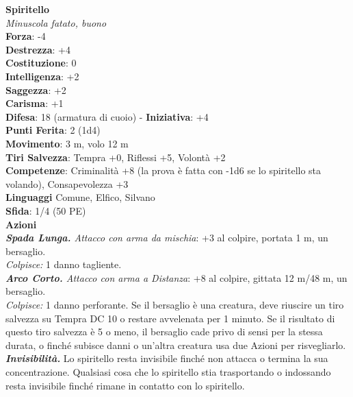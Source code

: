 \begin{multicols}{2}
\medskip\textbf{Spiritello}\\
\emph{Minuscola fatato, buono}\\
\textbf{Forza}: -4\\
\textbf{Destrezza}: +4\\
\textbf{Costituzione}: 0\\
\textbf{Intelligenza}: +2\\
\textbf{Saggezza}: +2\\
\textbf{Carisma}: +1\\
\textbf{Difesa}: 18 (armatura di cuoio) - \textbf{Iniziativa}: +4\\
\textbf{Punti Ferita}: 2 (1d4)\\
\textbf{Movimento}: 3 m, volo 12 m\\
\textbf{Tiri Salvezza}: Tempra +0, Riflessi +5, Volontà +2\\
\textbf{Competenze}: Criminalità +8 (la prova è fatta con -1d6 se lo spiritello sta volando), Consapevolezza +3\\
\textbf{Linguaggi} Comune, Elfico, Silvano\\
\textbf{Sfida}: 1/4 (50 PE)\smallskip\\
\smallskip\textbf{Azioni}\\
\emph{\textbf{Spada Lunga.} Attacco con arma da mischia}: +3 al colpire, portata 1 m, un bersaglio.\\
\emph{Colpisce:} 1 danno tagliente.\\
\emph{\textbf{Arco Corto.} Attacco con arma a Distanza}: +8 al colpire, gittata 12 m/48 m, un bersaglio.\\

\emph{Colpisce:} 1 danno perforante. Se il bersaglio è una creatura, deve riuscire un tiro salvezza su Tempra DC 10 o restare avvelenata per 1 minuto. Se il risultato di questo tiro salvezza è 5 o meno, il bersaglio cade privo di sensi per la stessa durata, o finché subisce danni o un'altra creatura usa due Azioni per risvegliarlo.\\

\emph{\textbf{Invisibilità.}} Lo spiritello resta invisibile finché non attacca o termina la sua concentrazione. Qualsiasi cosa che lo spiritello stia trasportando o indossando resta invisibile finché rimane in contatto con lo spiritello.\\


\end{multicols}

